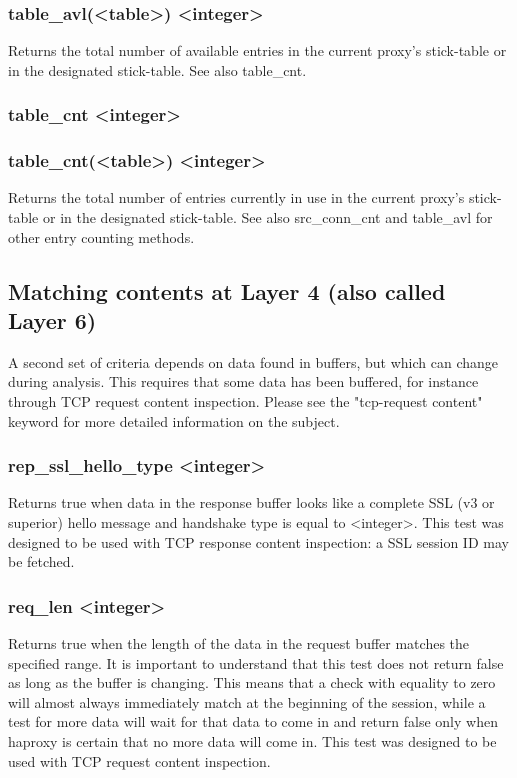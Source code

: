 \subsubsection*{table\_avl(<table>) <integer>}
  Returns the total number of available entries in the current proxy's
  stick-table or in the designated stick-table. See also table\_cnt.

\subsubsection[table\_cnt]{table\_cnt <integer>}
\subsubsection*{table\_cnt(<table>) <integer>}
  Returns the total number of entries currently in use in the current proxy's
  stick-table or in the designated stick-table. See also src\_conn\_cnt and
  table\_avl for other entry counting methods.

\subsection{Matching contents at Layer 4 (also called Layer 6)}

A second set of criteria depends on data found in buffers, but which can change
during analysis. This requires that some data has been buffered, for instance
through TCP request content inspection. Please see the "tcp-request content"
keyword for more detailed information on the subject.

\subsubsection[rep\_ssl\_hello\_type]{rep\_ssl\_hello\_type <integer>}
  Returns true when data in the response buffer looks like a complete SSL (v3
  or superior) hello message and handshake type is equal to <integer>.
  This test was designed to be used with TCP response content inspection: a
  SSL session ID may be fetched.

\subsubsection[req\_len]{req\_len <integer>}
  Returns true when the length of the data in the request buffer matches the
  specified range. It is important to understand that this test does not
  return false as long as the buffer is changing. This means that a check with
  equality to zero will almost always immediately match at the beginning of the
  session, while a test for more data will wait for that data to come in and
  return false only when haproxy is certain that no more data will come in.
  This test was designed to be used with TCP request content inspection.

